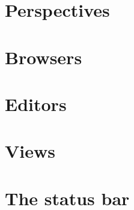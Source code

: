 

\section{Perspectives}


\section{Browsers}


\section{Editors}


\section{Views}


\section{The status bar}

